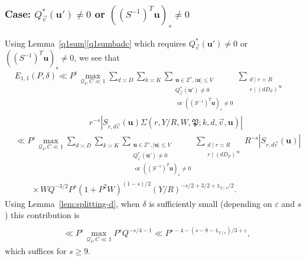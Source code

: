 \documentclass[letterpaper,11pt]{amsart}
\numberwithin{equation}{section}
\theoremstyle{definition}
\numberwithin{equation}{section}
\newcommand{\ZZ}{\mathbb{Z}}
\newcommand{\uu}{\mathbf{u}}
\newcommand{\uc}{{\vec{\mathrm{c}}}}
\newcommand{\ve}{\varepsilon}
\begin{document}
\subsubsection{Case: $Q_\uc^*(\uu')\not=0$ or $((S^{-1})^T\uu)_s\not=0$}
\label{sec:bad-c-Q-S-nonzero}
Using Lemma~\ref{q1sum}\eqref{q1sumbadc} which requires $Q_\uc^*(\uu')\not=0$ or $((S^{-1})^T\uu)_s\not=0$, we see that  
\begin{equation*}
\begin{split}
& E_{1,1}(P, \delta)\ll P^{\ve} \max_{ \mathcal Q_\delta, C\ll 1}\sum_{d\asymp D}\sum_{k\asymp K}\sum_{\substack{\uu\in\ZZ^s,  |\uu|\leq V\\ Q_\uc^*(\uu')\not=0 \\\text{ or } ((S^{-1})^T\uu)_s\not=0 }}\sum_{\substack{d\mid r\asymp R \\ r\mid (dD_F)^\infty}}\\&\quad\quad \quad \quad\quad \quad \quad\quad \quad  r^{-s}|S_{r, d\uc}(\uu) \Sigma(r, Y/R, W, \mathfrak P;k,d, \uc, \uu)|\\
&\ll P^{\ve} \max_{\mathcal Q_\delta, C\ll 1}
\sum_{d\asymp D}\sum_{k\asymp K}\sum_{\substack{\uu\in\ZZ^s,  |\uu|\leq V\\ Q_\uc^*(\uu')\not=0 \\\text{ or } ((S^{-1})^T\uu)_s\not=0 }}\sum_{\substack{d\mid r\asymp R\\ r\mid (dD_F)^\infty}}R^{-s}|S_{r, d\uc}(\uu)|\\ 
 &\quad\quad \times WQ^{-3/2} P^{s} (1+P^2W)^{(1-s)/2}(Y/R)^{-s/2+3/2+\mathds 1_{2\mid s}/2}.
\end{split}
\end{equation*}
Using Lemma~\ref{lem:splitting-d},
 when $\delta$ is sufficiently small (depending on $\ve$ and $s$) this contribution is
\begin{align*}
\\&\ll P^{\ve} \max_{ \mathcal Q_\delta, C\ll 1}P^{s}Q^{-s/4-1}\ll P^{s-4-(s-8-\mathds 1_{2\mid s})/3+\ve},
\end{align*}
which suffices for $s\geq 9$. 
\end{document}
